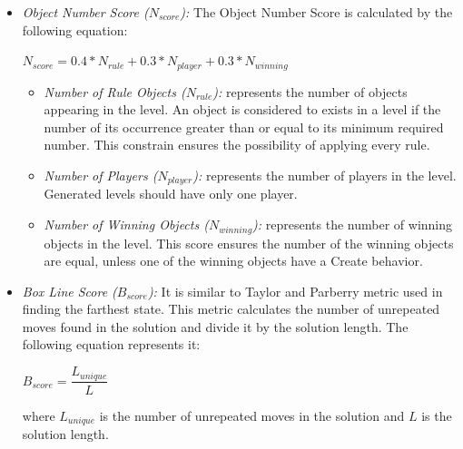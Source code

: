 \documentclass[letterpaper]{article}
\begin{document}
\begin{itemize}
	\item \emph{Object Number Score ($N_{score}$):} The Object Number Score is calculated by the following equation:
	\begin{center}$N_{score} = 0.4 * N_{rule} + 0.3 * N_{player} + 0.3 * N_{winning}$\end{center}
	\begin{itemize}
		\item \emph{Number of Rule Objects ($N_{rule}$):} represents the number of objects appearing in the level. An object is considered to exists in a level if the number of its occurrence greater than or equal to its minimum required number. This constrain ensures the possibility of applying every rule.
		\item \emph{Number of Players ($N_{player}$):} represents the number of players in the level. Generated levels should have only one player.
		\item \emph{Number of Winning Objects ($N_{winning}$):} represents the number of winning objects in the level. This score ensures the number of the winning objects are equal, unless one of the winning objects have a Create behavior.
	\end{itemize}
	
	\item \emph{Box Line Score ($B_{score}$):} It is similar to Taylor and Parberry metric \cite{sokobanLevelGenerationNew} used in finding the farthest state. This metric calculates the number of unrepeated moves found in the solution and divide it by the solution length. The following equation represents it:
	\begin{center}$B_{score} = \dfrac{L_{unique}}{L}$\end{center}
	where $L_{unique}$ is the number of unrepeated moves in the solution and $L$ is the solution length.
	

\end{itemize}
\end{document}
